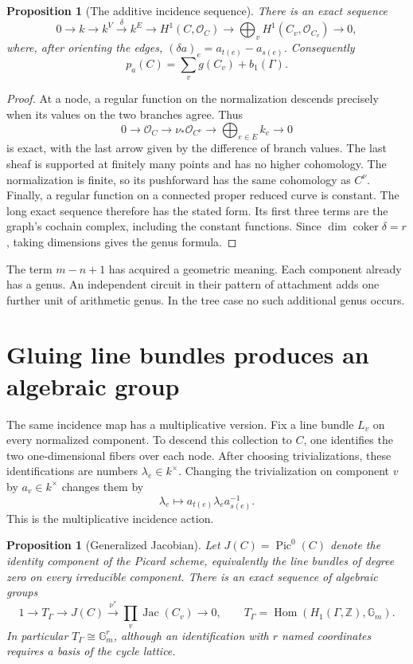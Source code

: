 \documentclass[11pt]{article}
\newtheorem{proposition}[theorem]{Proposition}
\theoremstyle{definition}
\theoremstyle{remark}
\newcommand{\Z}{\mathbb Z}
\begin{document}
\begin{proposition}[The additive incidence sequence]
There is an exact sequence
\[
  0\longrightarrow k\longrightarrow k^V
   \xrightarrow{\delta} k^E\longrightarrow H^1(C,\mathcal O_C)
   \longrightarrow\bigoplus_v H^1(C_v,\mathcal O_{C_v})
   \longrightarrow0,
\]
where, after orienting the edges,
$(\delta a)_e=a_{t(e)}-a_{s(e)}$.  Consequently
\[
  p_a(C)=\sum_v g(C_v)+b_1(\Gamma).
\]
\end{proposition}

\begin{proof}
At a node, a regular function on the normalization descends precisely when
its values on the two branches agree.  Thus
\[
  0\longrightarrow\mathcal O_C\longrightarrow
  \nu_*\mathcal O_{C^\nu}\longrightarrow
  \bigoplus_{e\in E}k_e\longrightarrow0
\]
is exact, with the last arrow given by the difference of branch values.
The last sheaf is supported at finitely many points and has no higher
cohomology.  The normalization is finite, so its pushforward has the same
cohomology as $C^\nu$.  Finally, a regular function on a connected proper
reduced curve is constant.  The long exact sequence therefore has the stated
form.  Its first three terms are the graph's cochain complex, including the
constant functions.  Since $\dim\operatorname{coker}\delta=r$, taking
dimensions gives the genus formula.
\end{proof}

The term $m-n+1$ has acquired a geometric meaning.  Each component already
has a genus.  An independent circuit in their pattern of attachment adds
one further unit of arithmetic genus.  In the tree case no such additional
genus occurs.

\section{Gluing line bundles produces an algebraic group}
\label{sec:graph-generalized-jacobian}

The same incidence map has a multiplicative version.  Fix a line bundle
$L_v$ on every normalized component.  To descend this collection to $C$,
one identifies the two one-dimensional fibers over each node.  After
choosing trivializations, these identifications are numbers
$\lambda_e\in k^\times$.  Changing the trivialization on component $v$ by
$a_v\in k^\times$ changes them by
\[
  \lambda_e\longmapsto a_{t(e)}\lambda_e a_{s(e)}^{-1}.
\]
This is the multiplicative incidence action.

\begin{proposition}[Generalized Jacobian]
Let $J(C)=\operatorname{Pic}^0(C)$ denote the identity component of the
Picard scheme, equivalently the line bundles of degree zero on every
irreducible component.  There is an exact sequence of algebraic groups
\[
  1\longrightarrow T_\Gamma\longrightarrow J(C)
   \xrightarrow{\nu^*}\prod_v\operatorname{Jac}(C_v)
   \longrightarrow0,
  \qquad
  T_\Gamma=\operatorname{Hom}(H_1(\Gamma,\Z),\mathbb G_m).
\]
In particular $T_\Gamma\cong\mathbb G_m^r$, although an identification
with $r$ named coordinates requires a basis of the cycle lattice.
\end{proposition}
\end{document}
